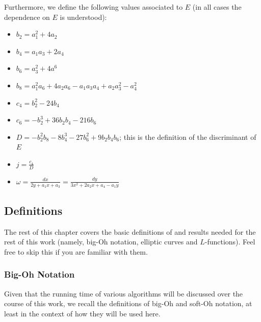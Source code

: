 \documentclass[10pt]{article}
\begin{document}
Furthermore, we define the following values associated to $E$ (in all cases the dependence on $E$ is understood):
\begin{itemize}
\item $b_2 = a_1^2 + 4a_2$
\item $b_4 = a_1 a_3 + 2a_4$
\item $b_6 = a_3^2 + 4a^6$
\item $b_8 = a_1^2 a_6 + 4 a_2 a_6 - a_1 a_3 a_4 + a_2 a_3^2 - a_4^2$
\item $c_4 = b_2^2 - 24 b_4$
\item $c_6 = -b_2^3 + 36 b_2 b_4  - 216 b_6$
\item $D = -b_2^2 b_8 - 8 b_4^3 - 27 b_6^2 + 9 b_2 b_4 b_6$; this is the definition of the discriminant of $E$
\item $j = \frac{c_4}{D}$
\item $\omega = \frac{dx}{2y + a_1 x + a_3} = \frac{dy}{3x^2 + 2a_2 x + a_4 - a_1 y}$
\end{itemize}

\newpage
\subsection{Definitions}

The rest of this chapter covers the basic definitions of and results needed for the rest of this work (namely, big-Oh notation, elliptic curves and $L$-functions). Feel free to skip this if you are familiar with them.

\subsubsection{Big-Oh Notation}

Given that the running time of various algorithms will be discussed over the course of this work, we recall the definitions of big-Oh and soft-Oh notation, at least in the context of how they will be used here.
\end{document}
